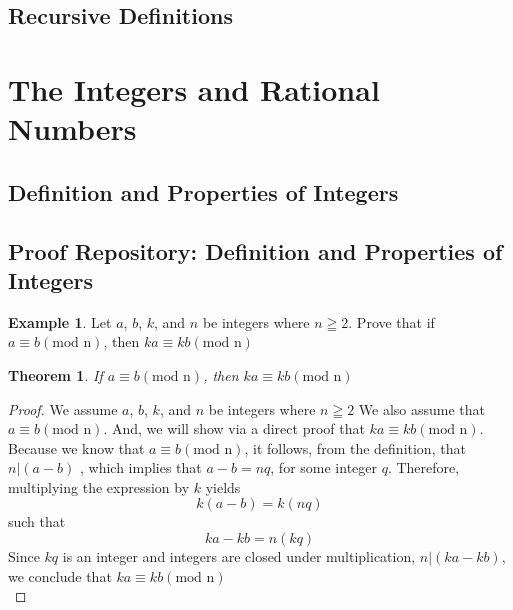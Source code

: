 \documentclass{book}
\newtheorem{theorem}{Theorem}[section]
\theoremstyle{definition}
\newtheorem{example}{Example}[definition]
\theoremstyle{remark}
\begin{document}
\subsection{Recursive Definitions}

\newpage
\section{The Integers and Rational Numbers}

\subsection{Definition and Properties of Integers}
\newpage
\subsection{Proof Repository: Definition and Properties of Integers} 


\begin{example}
Let $a$, $b$, $k$, and $n$ be integers where $n \geqq 2$. Prove that if $a \equiv b (\text{mod n})$, then $ka \equiv kb (\text{mod n})$

\begin{tcolorbox}
	\begin{theorem}
		If $a \equiv b (\text{mod n})$, then $ka \equiv kb (\text{mod n})$
	\end{theorem}
\end{tcolorbox}

\begin{proof}
We assume $a$, $b$, $k$, and $n$ be integers where $n \geqq 2$ We also assume that $a \equiv b (\text{mod n})$. And, we will show via a direct proof that $ka \equiv kb (\text{mod n})$. Because we know that $a \equiv b (\text{mod n})$, it follows, from the definition, that   $n | (a-b)$ , which implies that $a-b = nq$, for some integer $q$. Therefore, multiplying the expression by $k$ yields \[ k(a-b) = k(nq) \] such that \[ka - kb = n(kq) \]
Since $kq$ is an integer and integers are closed under multiplication, $n | (ka - kb)$, we conclude that $ka \equiv kb (\text{mod n})$ \\
\end{proof}
\end{example}
\end{document}
